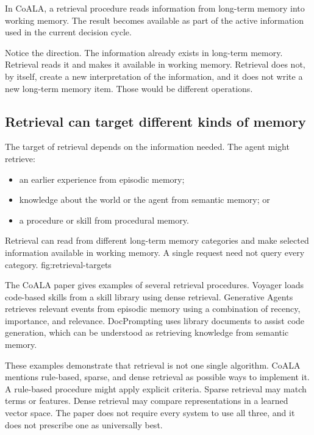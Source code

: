 In CoALA, a retrieval procedure reads information from long-term memory into working memory. The result becomes available as part of the active information used in the current decision cycle.

Notice the direction. The information already exists in long-term memory. Retrieval reads it and makes it available in working memory. Retrieval does not, by itself, create a new interpretation of the information, and it does not write a new long-term memory item. Those would be different operations.

\subsection{Retrieval can target different kinds of memory}

The target of retrieval depends on the information needed. The agent might retrieve:

\begin{itemize}
  \item an earlier experience from episodic memory;
  \item knowledge about the world or the agent from semantic memory; or
  \item a procedure or skill from procedural memory.
\end{itemize}

  {Retrieval can read from different long-term memory categories and make selected information available in working memory. A single request need not query every category.}
  {fig:retrieval-targets}

The CoALA paper gives examples of several retrieval procedures. Voyager loads code-based skills from a skill library using dense retrieval. Generative Agents retrieves relevant events from episodic memory using a combination of recency, importance, and relevance. DocPrompting uses library documents to assist code generation, which can be understood as retrieving knowledge from semantic memory.

These examples demonstrate that retrieval is not one single algorithm. CoALA mentions rule-based, sparse, and dense retrieval as possible ways to implement it. A rule-based procedure might apply explicit criteria. Sparse retrieval may match terms or features. Dense retrieval may compare representations in a learned vector space. The paper does not require every system to use all three, and it does not prescribe one as universally best.

